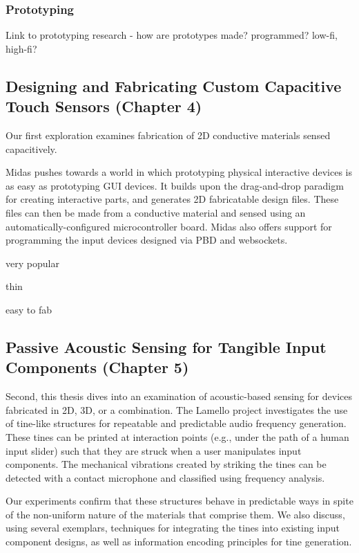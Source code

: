 \subsubsection{Prototyping}
Link to prototyping research - how are prototypes made? programmed? low-fi, high-fi?

\subsection{Designing and Fabricating Custom Capacitive Touch Sensors (Chapter 4)}


Our first exploration examines fabrication of 2D conductive materials sensed capacitively.

Midas pushes towards a world in which prototyping physical interactive devices is as easy as prototyping GUI devices. It builds upon the drag-and-drop paradigm for creating interactive parts, and generates 2D fabricatable design files. These files can then be made from a conductive material and sensed using an automatically-configured microcontroller board. Midas also offers support for programming the input devices designed via PBD and websockets.

very popular

thin

easy to fab


\subsection{Passive Acoustic Sensing for Tangible Input Components (Chapter 5)}

Second, this thesis dives into an examination of acoustic-based sensing for devices fabricated in 2D, 3D, or a combination. The Lamello project investigates the use of tine-like structures for repeatable and predictable audio frequency generation. These tines can be printed at interaction points (e.g., under the path of a human input slider) such that they are struck when a user manipulates input components. The mechanical vibrations created by striking the tines can be detected with a contact microphone and classified using frequency analysis.

Our experiments confirm that these structures behave in predictable ways in spite of the non-uniform nature of the materials that comprise them. We also discuss, using several exemplars, techniques for integrating the tines into existing input component designs, as well as information encoding principles for tine generation.

